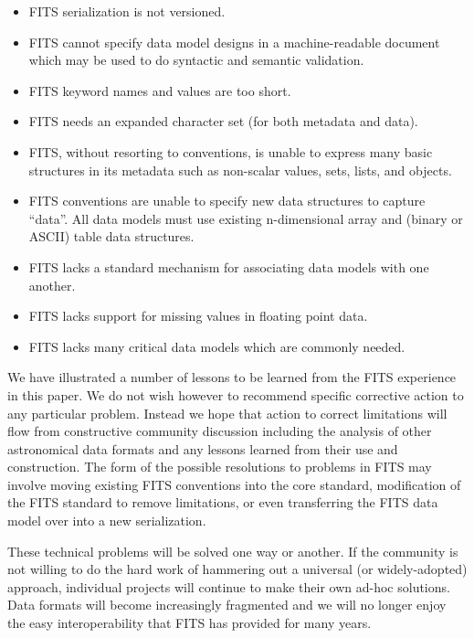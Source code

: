 \documentclass[final,authoryear,5p,times,twocolumn]{elsarticle}
\begin{document}
{{\begin{itemize}

\item FITS serialization is not versioned.

\item FITS cannot specify data model designs in a machine-readable document
which may be used to do syntactic and semantic validation.

\item FITS keyword names and values are too short.

\item FITS needs an expanded character set (for both metadata and data).

\item FITS, without resorting to conventions, is unable to express many basic structures in 
its metadata such as non-scalar values, sets, lists, and objects.

\item FITS conventions are unable to specify new data structures to capture 
``data''. All data models must use existing n-dimensional array and (binary or
ASCII) table data structures.

\item FITS lacks a standard mechanism for associating data models with one another.

\item FITS lacks support for missing values in floating point data.

\item FITS lacks many critical data models which are commonly needed.

\end{itemize}


We have illustrated a number of lessons to be learned from the FITS experience
in this paper. We do not wish however to recommend specific corrective action 
to any particular problem. Instead we hope that action to correct limitations
will flow from constructive community discussion including the analysis of
other astronomical data formats and any lessons learned from their use
and construction.
The form of the possible resolutions to problems in FITS may involve moving 
existing FITS conventions into the core standard, modification of the FITS 
standard to remove limitations, or even transferring the FITS data model over
into a new serialization. 

These technical problems will be solved one way or another. If the
community is not willing to do the hard work of hammering out a
universal (or widely-adopted) approach, individual projects will
continue to make their own ad-hoc solutions. Data formats will become
increasingly fragmented and we will no longer enjoy the easy
interoperability that FITS has provided for many years.



}}
\end{document}
